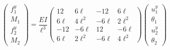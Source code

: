 \documentclass[11pt]{article}
\begin{document}
\[\left(\begin{array}{r} 
f_{1}^y\\M_1\\f_{2}^y\\M_2
\end{array}\right)=\frac{EI}{\ell^3}\left(\begin{array}{rrrr} 
12&6\ell&-12&6\ell\\
6\ell&4\ell^2&-6\ell&2\ell^2\\
-12&-6\ell&12&-6\ell\\
6\ell&2\ell^2&-6\ell&4\ell^2
\end{array}\right) \left(\begin{array}{l} 
u_{1}^y\\\theta_1\\u_{2}^y\\\theta_2
\end{array}\right) \]
\end{document}
